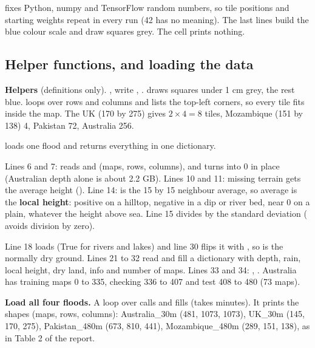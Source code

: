  fixes Python, numpy and TensorFlow random numbers, so tile positions and starting weights repeat in every run (42 has no meaning). The last lines build the blue colour scale and draw  squares grey. The cell prints nothing.


\subsection{Helper functions,  and loading the data}

\textbf{Helpers} (definitions only). ,  write , .  draws squares under 1 cm grey, the rest blue.  loops  over rows and columns and lists the top-left corners, so every tile fits inside the map. The UK (170 by 275) gives $2\times4 = 8$ tiles, Mozambique (151 by 138) 4, Pakistan 72, Australia 256.

\textbf{} loads one flood and returns everything in one dictionary.

Lines 6 and 7:  reads  and  (maps, rows, columns), and  turns  into 0 in place (Australian depth alone is about 2.2 GB). Lines 10 and 11: missing terrain gets the average height (). Line 14:  is the 15 by 15 neighbour average, so  average is the \textbf{local height}: positive on a hilltop, negative in a dip or river bed, near 0 on a plain, whatever the height above sea. Line 15 divides by the standard deviation ( avoids division by zero).

Line 18 loads  (True for rivers and lakes) and line 30 flips it with \cd{\textasciitilde}, so  is the normally dry ground. Lines 21 to 32 read  and fill a dictionary with depth, rain, local height, dry land, info and number of maps. Lines 33 and 34: , . Australia has training maps 0 to 335, checking 336 to 407 and test 408 to 480 (73 maps).

\textbf{Load all four floods.} A loop over  calls  and fills  (takes minutes). It prints the shapes (maps, rows, columns): Australia\_30m (481, 1073, 1073), UK\_30m (145, 170, 275), Pakistan\_480m (673, 810, 441), Mozambique\_480m (289, 151, 138), as in Table 2 of the report.

